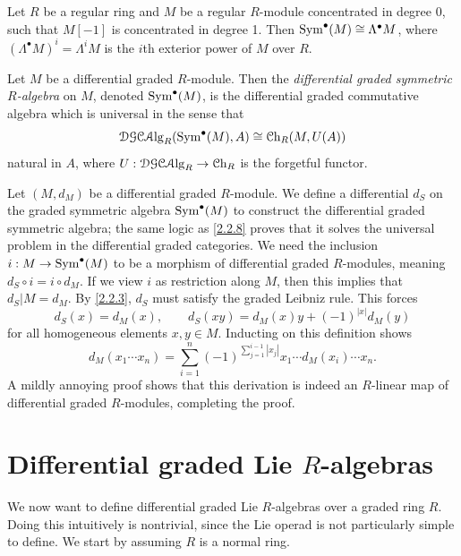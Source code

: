 \begin{example}\label{2.2.9}
	Let $R$ be a regular ring and $M$ be a regular $R$-module concentrated in degree 0, such that $M[-1]$ is concentrated in degree 1. Then $\operatorname{Sym} ^{\bullet} (M) \cong \Lambda ^{\bullet} M$, where $(\Lambda^{\bullet} M)^i = \Lambda ^iM$ is the $i$th exterior power of $M$ over $R$.
\end{example}

\begin{definition}\label{2.2.10}
	Let $M$ be a differential graded $R$-module. Then the \emph{differential graded symmetric $R$-algebra} on $M$, denoted $\operatorname{Sym}^{\bullet}  (M)$, is the differential graded commutative algebra which is universal in the sense that
	\[
		\mathcal{DG}\mathcal{C} \mathcal{A}\mathrm{lg}_{R} (\operatorname{Sym}^{\bullet}  (M),A) \cong \mathcal{C}\mathrm{h}_{R} (M,U(A))
	\]
	natural in $A$, where $U : \mathcal{DG} \mathcal{C} \mathcal{A}\mathrm{lg}_{R}  \to \mathcal{C}\mathrm{h}_{R} $ is the forgetful functor.
\end{definition}
\begin{construction}\label{2.2.11}
	Let $(M,d_M)$ be a differential graded $R$-module. We define a differential $d_{S} $ on the graded symmetric algebra $\operatorname{Sym}^{\bullet}  (M)$ to construct the differential graded symmetric algebra; the same logic as \cref{2.2.8} proves that it solves the universal problem in the differential graded categories. We need the inclusion $i : M \to \operatorname{Sym}^{\bullet}  (M)$ to be a morphism of differential graded $R$-modules, meaning $d_S\circ i=i\circ d_M$. If we view $i$ as restriction along $M$, then this implies that $d_S|M=d_M$.	By \cref{2.2.3}, $d_S$ must satisfy the graded Leibniz rule. This forces
	\[
		d_S(x) = d_M(x),\qquad d_S(xy) = d_M(x)y + (-1)^{\left| x \right| } d_M(y)
	\]
	for all homogeneous elements $x,y\in M$. Inducting on this definition shows
	\[
		d_M(x_1 \cdots x_n) = \sum_{i=1}^{n} (-1)^{\sum_{j=1}^{i-1} \left| x_j \right|} x_1 \cdots d_M(x_i)\cdots x_n
	.\]
	A mildly annoying proof shows that this derivation is indeed an $R$-linear map of differential graded $R$-modules, completing the proof.
\end{construction}

\section{Differential graded Lie $R$-algebras}

We now want to define differential graded Lie $R$-algebras over a graded ring $R$. Doing this intuitively is nontrivial, since the Lie operad is not particularly simple to define. We start by assuming $R$ is a normal ring.

